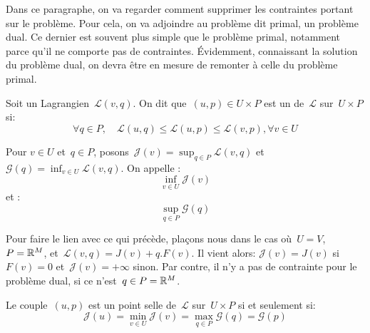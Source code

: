 Dans ce paragraphe, on va regarder comment supprimer les contraintes portant sur le problème. Pour cela, on va adjoindre au problème dit primal, un problème dual. Ce dernier est souvent plus simple que le problème primal, notamment parce qu'il ne comporte pas de contraintes. Évidemment, connaissant la solution du problème dual, on devra être en mesure de remonter à celle du problème primal.

\begin{definition}
Soit un Lagrangien~$\mathcal{L}(v,q)$.
On dit que~$(u,p)\in U\times P$ est un  de~$\mathcal{L}$ sur~$U\times P$ si:
\begin{equation}
\forall q\in P, \quad \mathcal{L}(u,q) \le \mathcal{L}(u,p) \le \mathcal{L}(v,p), \forall v\in U
\end{equation}

Pour $v\in U$ et~$q\in P$, posons~$\mathcal{J}(v)=\sup_{q\in P}\mathcal{L}(v,q)$ et~$\mathcal{G}(q)=\inf_{v\in U}\mathcal{L}(v,q)$.
On appelle :
\begin{equation}
\inf_{v\in U} \mathcal{J}(v)
\end{equation}
et :
\begin{equation}
\sup_{q\in P} \mathcal{G}(q)
\end{equation}
\end{definition}

Pour faire le lien avec ce qui précède, plaçons nous dans le cas où~$U=V$, $P=\mathbb R^M$, et~$\mathcal{L}(v,q)=J(v)+q.F(v)$.
Il vient alors: $\mathcal{J}(v)=J(v)$ si~$F(v)=0$ et~$\mathcal{J}(v)=+\infty$ sinon.
Par contre, il n'y a pas de contrainte pour le problème dual, si ce n'est~$q\in P=\mathbb R^M$.


\begin{theoreme}
Le couple~$(u,p)$ est un point selle de~$\mathcal{L}$ sur~$U\times P$ si et seulement si:
\begin{equation}
\mathcal{J}(u)=\min_{v\in U}\mathcal{J}(v) = \max_{q\in P}\mathcal{G}(q)=\mathcal{G}(p)
\end{equation}
\end{theoreme}



